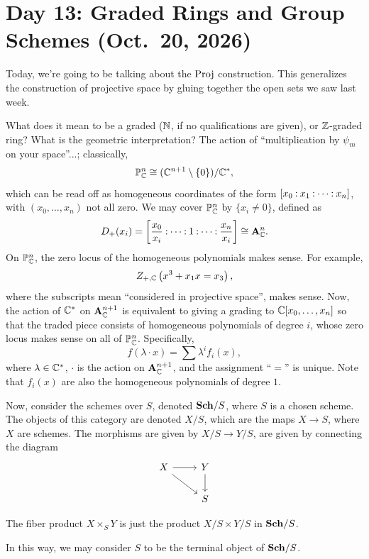 \section{Day 13: Graded Rings and Group Schemes (Oct.\ 20, 2026)}
Today, we're going to be talking about the $\operatorname{Proj}$ construction. This generalizes the construction of projective space by gluing together the open sets we saw last week.

What does it mean to be a graded ($\mathbb N$, if no qualifications are given), or $\mathbb Z$-graded ring? What is the geometric interpretation? The action of ``multiplication by $\psi_m$ on your space''...; classically,
\[ \mathbb P^n_\mathbb C \cong (\mathbb C^{n+1} \setminus \{0\}) / \mathbb C^\ast, \]
which can be read off as homogeneous coordinates of the form $\coor{x_0 : x_1 : \dots : x_n}$, with $(x_0, \dots, x_n)$ not all zero. We may cover $\mathbb P^n_\mathbb C$ by $\{x_i \neq 0\}$, defined as
\[ D_+(x_i) = \coor{\frac{x_0}{x_i} : \dots : 1 : \dots : \frac{x_n}{x_i}} \cong \mbf A_\CC^n. \]
On $\mathbb P^n_\mathbb C$, the zero locus of the homogeneous polynomials makes sense. For example,
\[ Z_{+,\mathbb C}\left(x^3 + x_1 x = x_3\right), \]
where the subscripts mean ``considered in projective space'', makes sense. Now, the action of $\mathbb C^\ast$ on $\mathbf A_\mathbb C^{n+1}$ is equivalent to giving a grading to $\mathbb C[x_0, \dots, x_n]$ so that the traded piece consists of homogeneous polynomials of degree $i$, whose zero locus makes sense on all of $\mathbb P^n_\mathbb C$. Specifically,
\[ f(\lambda \cdot x) = \sum \lambda^i f_i(x), \]
where $\lambda \in \mathbb C^\ast$, $\cdot$ is the action on $\mathbf A_\mathbb C^{n+1}$, and the assignment ``$=$'' is unique. Note that $f_i(x)$ are also the homogeneous polynomials of degree $1$.

Now, consider the schemes over $S$, denoted $\mathbf{Sch} / S$, where $S$ is a chosen scheme. The objects of this category are denoted $X/S$, which are the maps $X \to S$, where $X$ are schemes. The morphisms are given by $X/S \to Y/S$, are given by connecting the diagram
\[ \begin{tikzcd} X \arrow[r] \arrow[rd] & Y \arrow[d] \\ & S \end{tikzcd} \]
\vspace{-8pt} \begin{theorem} \label{thm:fiber_product_in_schemes_over_scheme}
    The fiber product $X \times_S Y$ is just the product $X/S \times Y/S$ in $\mathbf{Sch}/S$.
\end{theorem}
In this way, we may consider $S$ to be the terminal object of $\mathbf{Sch}/S$.

